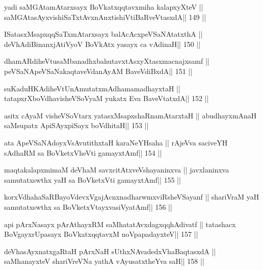 \begin{shl}
yadi saMGAtamAtarxsayx BoVkatxqqtavxmiha kalapxyXteV ||
saMGAtasAyxvishiSaTxtAvxnAnxtishiVtiBaRveVtasxdA\hfill || 149 ||
\end{shl}

\begin{shl}
ISatasxMsapxqqSaTxmAtarxsayx balAcAcx\s\s peVSaNAtatxthA ||
deVhAdiBinanxjAtiVyoV BoVkAtx yasayx ca vAdinaH\hfill || 150 ||
\end{shl}

\begin{shl}
dhamARdiheVtusaMbanadhxbahutavxtAsxyXtasxmacnajxsamf ||
peVSaNApeVSaNakaqtaveVdanAyAM BaveVdiBxdA\hfill || 151 ||
\end{shl}

\begin{shl}
suKaduHKAdiheVtUnAmutatxmAdhamamadhayxtaH ||
tatapxrXboVdhavisheVSoV\s yaM yukatx Eva BaveVtatxdA\hfill || 152 ||
\end{shl}

\begin{shl}
asitx cAyaM visheVSoV\s tarx yatasxMsapxshaRnamAtarxtaH ||
abudhayxmAnaH saMsupatx ApiSAyx\s\s piSayx boVdhitaH\hfill || 153 ||
\end{shl}

\begin{shl}
ata ApeVSaNAdoyxV\s sAvutithxtaH karaNeYHsaha ||
rAjeVva saciveYH sAdhaRM sa BoVketxVheVti gamayxtAmf\hfill || 154 ||
\end{shl}

\begin{shl}
maqtakalapxmimaM deVhaM savxcitAtxveVshayaninxva ||
javxlaninxva samutatxswthx yaH sa BoVketxVti gamayxtAmf\hfill || 155 ||
\end{shl}

\begin{shl}
korxVdhahaSaRBayoVdevxVgajAcnxnadharwmxviRsheVSayanf ||
shariVraM yaH samutatxswthx sa BoVketxVtayxvasiVyatAmf\hfill || 156 ||
\end{shl}

\begin{shl}
api pArxNasayx pArAthayxRM saMhatatAvxdagxqqhAdivatf ||
tatashacx BoVgayxrUpasayx BoVkatxqqtavxM noVpapadayxteV\hfill || 157 ||
\end{shl}

\begin{shl}
deVhasAyxnatxgaRtaH pArxNaH sUthxNAvadedxVhaBaqtasxdA ||
saMhanayxteV shariVreVNa yathA vAyusatxtheYva saH\hfill || 158 ||
\end{shl}

